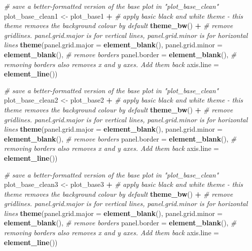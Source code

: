 \documentclass[
]{article}
\newenvironment{Shaded}{\begin{snugshade}}{\end{snugshade}}
\newcommand{\CommentTok}[1]{\textcolor[rgb]{0.56,0.35,0.01}{\textit{#1}}}
\newcommand{\DataTypeTok}[1]{\textcolor[rgb]{0.13,0.29,0.53}{#1}}
\newcommand{\KeywordTok}[1]{\textcolor[rgb]{0.13,0.29,0.53}{\textbf{#1}}}
\newcommand{\NormalTok}[1]{#1}
\newcommand{\OperatorTok}[1]{\textcolor[rgb]{0.81,0.36,0.00}{\textbf{#1}}}
\newcommand{\StringTok}[1]{\textcolor[rgb]{0.31,0.60,0.02}{#1}}
\begin{document}
\begin{Shaded}
\begin{Highlighting}[]
 
  \CommentTok{# save a better-formatted version of the base plot in "plot_base_clean"}
\NormalTok{ plot_base_clean1 <-}\StringTok{ }\NormalTok{plot_base1 }\OperatorTok{+}\StringTok{ }
\StringTok{   }\CommentTok{# apply basic black and white theme - this theme removes the background colour by default}
\StringTok{   }\KeywordTok{theme_bw}\NormalTok{() }\OperatorTok{+}\StringTok{ }
\StringTok{   }\CommentTok{# remove gridlines. panel.grid.major is for vertical lines, panel.grid.minor is for horizontal lines}
\StringTok{   }\KeywordTok{theme}\NormalTok{(}\DataTypeTok{panel.grid.major =} \KeywordTok{element_blank}\NormalTok{(), }\DataTypeTok{panel.grid.minor =} \KeywordTok{element_blank}\NormalTok{(),}
         \CommentTok{# remove borders}
         \DataTypeTok{panel.border =} \KeywordTok{element_blank}\NormalTok{(),}
         \CommentTok{# removing borders also removes x and y axes. Add them back}
         \DataTypeTok{axis.line =} \KeywordTok{element_line}\NormalTok{())}
 
 \CommentTok{# save a better-formatted version of the base plot in "plot_base_clean"}
\NormalTok{ plot_base_clean2 <-}\StringTok{ }\NormalTok{plot_base2 }\OperatorTok{+}\StringTok{ }
\StringTok{   }\CommentTok{# apply basic black and white theme - this theme removes the background colour by default}
\StringTok{   }\KeywordTok{theme_bw}\NormalTok{() }\OperatorTok{+}\StringTok{ }
\StringTok{   }\CommentTok{# remove gridlines. panel.grid.major is for vertical lines, panel.grid.minor is for horizontal lines}
\StringTok{   }\KeywordTok{theme}\NormalTok{(}\DataTypeTok{panel.grid.major =} \KeywordTok{element_blank}\NormalTok{(), }\DataTypeTok{panel.grid.minor =} \KeywordTok{element_blank}\NormalTok{(),}
         \CommentTok{# remove borders}
         \DataTypeTok{panel.border =} \KeywordTok{element_blank}\NormalTok{(),}
         \CommentTok{# removing borders also removes x and y axes. Add them back}
         \DataTypeTok{axis.line =} \KeywordTok{element_line}\NormalTok{())}
 
 \CommentTok{# save a better-formatted version of the base plot in "plot_base_clean"}
\NormalTok{ plot_base_clean3 <-}\StringTok{ }\NormalTok{plot_base3 }\OperatorTok{+}\StringTok{ }
\StringTok{   }\CommentTok{# apply basic black and white theme - this theme removes the background colour by default}
\StringTok{   }\KeywordTok{theme_bw}\NormalTok{() }\OperatorTok{+}\StringTok{ }
\StringTok{   }\CommentTok{# remove gridlines. panel.grid.major is for vertical lines, panel.grid.minor is for horizontal lines}
\StringTok{   }\KeywordTok{theme}\NormalTok{(}\DataTypeTok{panel.grid.major =} \KeywordTok{element_blank}\NormalTok{(), }\DataTypeTok{panel.grid.minor =} \KeywordTok{element_blank}\NormalTok{(),}
         \CommentTok{# remove borders}
         \DataTypeTok{panel.border =} \KeywordTok{element_blank}\NormalTok{(),}
         \CommentTok{# removing borders also removes x and y axes. Add them back}
         \DataTypeTok{axis.line =} \KeywordTok{element_line}\NormalTok{())}


\end{Highlighting}
\end{Shaded}
\end{document}
